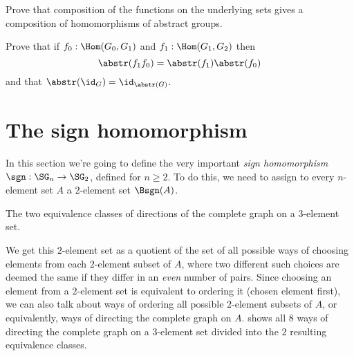 \begin{xca}
Prove that composition of the functions on the underlying sets gives a composition of homomorphisms of abstract groups.

  Prove that if $f_0:\Hom(G_0,G_1)$ and $f_1:\Hom(G_1,G_2)$ then
$$\abstr(f_1f_0)=\abstr(f_1)\abstr(f_0)$$ and that $\abstr(\id_G)=\id_{\abstr(G)}$.
\end{xca}

\section{The sign homomorphism}
\label{sec:sign-homomorphism}

In this section we're going to define the very important
\emph{sign homomorphism} $\sgn : \SG_n \to \SG_2$, defined for $n \ge 2$.
To do this, we need to assign to every $n$-element set $A$ a $2$-element set $\Bsgn(A)$.
\begin{marginfigure}
  \caption{The two equivalence classes of directions of the complete graph
    on a $3$-element set.}
  \label{fig:sign-orderings-3}
\end{marginfigure}

We get this $2$-element set as a quotient of the set of all possible ways of
choosing elements from each $2$-element subset of $A$, where two different such
choices are deemed the same if they differ in an \emph{even} number of pairs.
Since choosing an element from a $2$-element set is equivalent to ordering it
(\eg chosen element first),
we can also talk about ways of ordering all possible $2$-element subsets of $A$,
or equivalently, ways of directing the complete graph on $A$.
 shows all $8$ ways of directing the complete graph on
a $3$-element set divided into the $2$ resulting equivalence classes.

